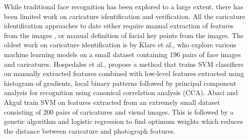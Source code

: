 While traditional face recognition has been explored to a large extent, there has been limited work on caricature identification and verification. All the caricature identification approaches to date either require manual extraction of features from the images \cite{rw1, rw2, rw3}, or manual definition of facial key points from the images. The oldest work on caricature identification is by Klare et al., \cite{rw1} who explore various machine learning models on a small dataset containing 196 pairs of face images and caricatures. Hospedales et al., \cite{rw2} propose a method that trains SVM classifiers on manually extracted features combined with low-level features extracted using histogram of gradients, local binary patterns followed by principal component analysis for recognition using canonical correlation analysis (CCA). Abaci and Akgul\cite{rw3} train SVM on features extracted from an extremely small dataset consisting of 200 pairs of caricatures and visual images. This is followed by a genetic algorithm and logistic regression to find optimum weights which reduces the distance between caricature and photograph features. %



